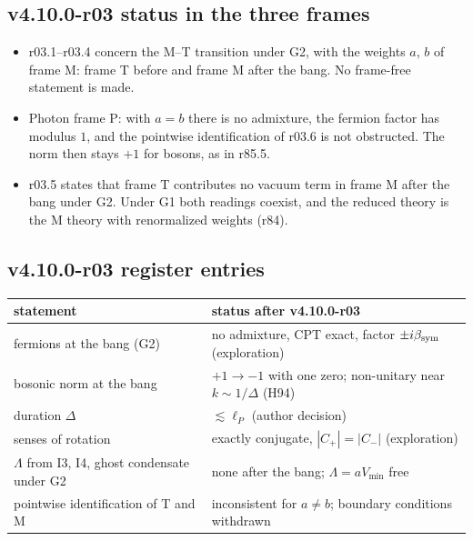 \subsection*{v4.10.0-r03 status in the three frames}
\label{subsec:v4100-r03-frames}

\begin{itemize}[leftmargin=2em]
\item r03.1--r03.4 concern the M--T transition under G2, with the weights \(a\), \(b\) of frame M: frame T before and frame M after the bang.  No frame-free
statement is made.
\item Photon frame P: with \(a=b\) there is no admixture, the fermion factor has modulus \(1\), and the pointwise identification of r03.6 is not obstructed.
The norm then stays \(+1\) for bosons, as in r85.5.
\item r03.5 states that frame T contributes no vacuum term in frame M after the bang under G2.  Under G1 both readings coexist, and the reduced theory is
the M theory with renormalized weights (r84).
\end{itemize}

\subsection*{v4.10.0-r03 register entries}
\label{subsec:v4100-r03-register}

\begin{center}
\small
\begin{tabular}{@{}>{\raggedright\arraybackslash}p{}>{\raggedright\arraybackslash}p{}@{}}
\toprule
statement & status after v4.10.0-r03\\
\midrule
fermions at the bang (G2) & no admixture, CPT exact, factor \(\pm i\beta_{\rm sym}\) (exploration)\\
bosonic norm at the bang & \(+1\to-1\) with one zero; non-unitary near \(k\sim1/\Delta\) (H94)\\
duration \(\Delta\) & \(\lesssim\ell_P\) (author decision)\\
senses of rotation & exactly conjugate, \(|C_+|=|C_-|\) (exploration)\\
\(\Lambda\) from I3, I4, ghost condensate under G2 & none after the bang; \(\Lambda=aV_{\min}\) free\\
pointwise identification of T and M & inconsistent for \(a\neq b\); boundary conditions withdrawn\\
\bottomrule
\end{tabular}
\end{center}

